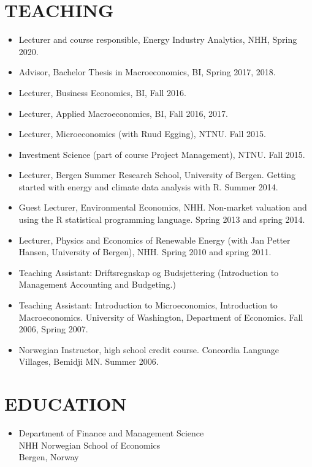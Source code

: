 \documentclass[margin]{res}
\begin{document}
\begin{resume}
\section{TEACHING}
\begin{itemize}
\setlength{\itemsep}{10pt}
\item[] Lecturer and course responsible, Energy Industry Analytics, NHH, Spring 2020.
\item[] Advisor, Bachelor Thesis in Macroeconomics, BI, Spring 2017, 2018.
\item[] Lecturer, Business Economics, BI, Fall 2016.
\item[] Lecturer, Applied Macroeconomics, BI, Fall 2016, 2017.
\item[] Lecturer, Microeconomics (with Ruud Egging), NTNU.  Fall 2015.
\item[] Investment Science (part of course Project Management), NTNU.  Fall 2015.
\item[] Lecturer, Bergen Summer Research School, University of Bergen.  Getting started with energy and climate data analysis with R.  Summer 2014.
\item[] Guest Lecturer, Environmental Economics, NHH.  Non-market valuation and using the R statistical programming language.  Spring 2013 and spring 2014.
\item[] Lecturer, Physics and Economics of Renewable Energy (with Jan Petter Hansen, University of Bergen), NHH.  Spring 2010 and spring 2011.
\item[] Teaching Assistant: Driftsregnskap og Budsjettering (Introduction to Management Accounting and Budgeting.)
\item[] Teaching Assistant: Introduction to Microeconomics, Introduction to Macroeconomics.  University of Washington, Department of Economics. Fall 2006, Spring 2007.
\item[] Norwegian Instructor, high school credit course.  Concordia Language Villages, Bemidji MN.  Summer 2006.
\end{itemize}

\section{EDUCATION}

\begin{itemize}
\normalsize{\section{Ph.D. Business Economics \\ August 2008 - May 2012}}
\item[] Department of Finance and Management Science\\
NHH Norwegian School of Economics \\
Bergen, Norway \\


\end{itemize}
\end{resume}
\end{document}
